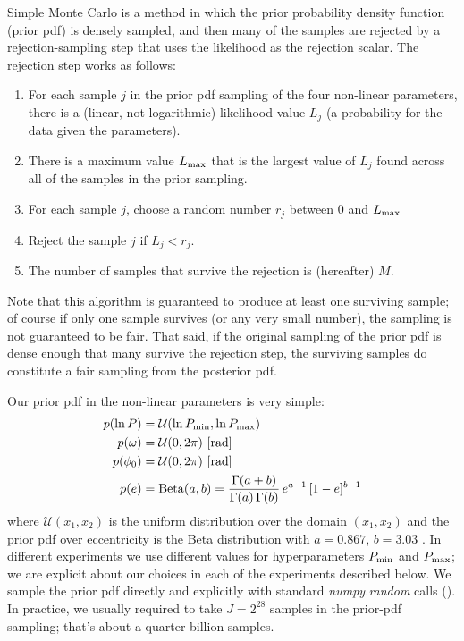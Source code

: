 \documentclass[manuscript, letterpaper]{aastex6}
\newcommand{\project}[1]{\textsl{#1}}
\begin{document}
Simple Monte Carlo is a method in which the prior probability density function
(prior pdf) is densely sampled, and then many of the samples are rejected by a
rejection-sampling step that uses the likelihood as the rejection scalar.
The rejection step works as follows:
\begin{enumerate}\itemsep0ex
\item For each sample $j$ in the prior pdf sampling of the four non-linear
  parameters, there is a (linear, not logarithmic) likelihood value $L_j$ (a
  probability for the data given the parameters).
\item There is a maximum value $L_{\rm max}$ that is the largest value of
  $L_j$ found across all of the samples in the prior sampling.
\item For each sample $j$, choose a random number $r_j$ between 0 and
  $L_{\rm max}$
\item Reject the sample $j$ if $L_j < r_j$.
\item The number of samples that survive the rejection is (hereafter) $M$.
\end{enumerate}
Note that this algorithm is guaranteed to produce at least one
surviving sample; of course if only one sample survives (or any very
small number), the sampling is not guaranteed to be fair.
That said, if the original sampling of the prior pdf is dense enough
that many survive the rejection step, the surviving samples do
constitute a fair sampling from the posterior pdf.

Our prior pdf in the non-linear parameters is very simple:
\begin{align}
    p(\ln P) &= \mathcal{U}(\ln P_{\rm min}, \ln P_{\rm max})\\
    p(\omega) &= \mathcal{U}(0, 2\pi) ~ [{\rm rad}]\\
    p(\phi_0) &= \mathcal{U}(0, 2\pi) ~ [{\rm rad}]\\
    p(e) &= {\rm Beta}(a, b) = \frac{\Gamma(a+b)}{\Gamma(a) \, \Gamma(b)} \, e^{a-1} \, [1 - e]^{b-1}
\end{align}
where $\mathcal{U}(x_1, x_2)$ is the uniform distribution over the
domain $(x_1, x_2)$ and the prior pdf over eccentricity is the Beta
distribution with $a=0.867$, $b=3.03$ \citep{Kipping:2013}.
In different experiments we use different values for hyperparameters
$P_{\rm min}$ and $P_{\rm max}$; we are explicit about our choices in
each of the experiments described below.
We sample the prior pdf directly and explicitly with standard
\project{numpy.random} calls (\citealt{Van-der-Walt:2011}).
In practice, we usually required to take $J=2^{28}$ samples in the prior-pdf
sampling; that's about a quarter billion samples. %
\end{document}
